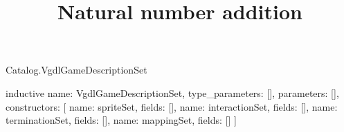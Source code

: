 \begin{lexlean}{Catalog.VgdlGameDescriptionSet}
\title{Natural number addition}
\begin{semanticmodule}
inductive{
  name: VgdlGameDescriptionSet,
  type_parameters: [],
  parameters: [],
  constructors: [
    {name: spriteSet, fields: []},
    {name: interactionSet, fields: []},
    {name: terminationSet, fields: []},
    {name: mappingSet, fields: []}
  ]
}
\end{semanticmodule}
\end{lexlean}
